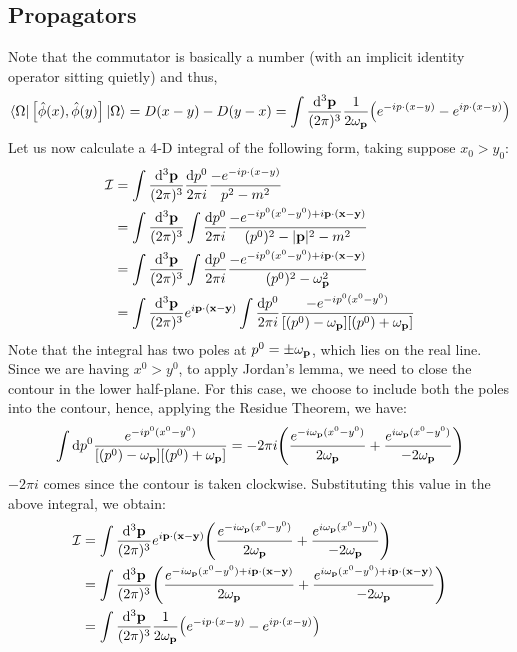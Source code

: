\subsection{Propagators}
Note that the commutator is basically a number (with an implicit identity operator sitting quietly) and thus, 
\begin{align*}
    \bra{\Omega} \left[ \hat{\phi}(x),  \hat{\phi}(y) \right]\ket{\Omega} = D(x-y) - D(y-x) = \int\frac{\dd^3\vb{{\vb{p}}}}{(2\pi)^3}\frac{1}{2\omega_{\vb{{p}}}} \qty(e^{-i p \cdot (x-y)} - e^{ip\cdot (x-y)})
\end{align*}
Let us now calculate a 4-D integral of the following form, taking suppose $x_0>y_0$:
\begin{align*}
    \mathcal{I} &= \int\frac{\dd^3\vb{{\vb{p}}}}{(2\pi)^3} \frac{\dd p^0}{2\pi i} \frac{-e^{-i p\cdot (x-y)}}{p^2-m^2}\\
    &= \int\frac{\dd^3\vb{{\vb{p}}}}{(2\pi)^3} \int\frac{\dd p^0}{2\pi i} \frac{-e^{-i p^0(x^0-y^0) + i \vb{p}\cdot( \vb{x}- \vb{y})}}{(p^0)^2-|\vb{p}|^2-m^2}\\
     &= \int\frac{\dd^3\vb{{\vb{p}}}}{(2\pi)^3} \int\frac{\dd p^0}{2\pi i} \frac{-e^{-i p^0(x^0-y^0) + i \vb{p}\cdot( \vb{x}- \vb{y})}}{(p^0)^2-\omega_{\vb{{p}}}^2}\\
     &= \int\frac{\dd^3\vb{{\vb{p}}}}{(2\pi)^3}e^{i \vb{p}\cdot( \vb{x}- \vb{y})}\int \frac{\dd p^0}{2\pi i}  \frac{-e^{-i p^0(x^0-y^0) }}{[(p^0)-\omega_{\vb{{p}}}][(p^0)+\omega_{\vb{{p}}}]}
\end{align*}
Note that the integral has two poles at $p^0 = \pm\omega_{\vb{{p}}}$, which lies on the real line. Since we are having $x^0>y^0$, to apply Jordan's lemma, we need to close the contour in the lower half-plane. For this case, we choose to include both the poles into the contour, hence, applying the Residue Theorem, we have:
\begin{align*}
    \int {\dd p^0} \frac{e^{-i p^0(x^0-y^0) }}{[(p^0)-\omega_{\vb{{p}}}][(p^0)+\omega_{\vb{{p}}}]} = -2\pi i \qty(\frac{e^{-i\omega_{\vb{{p}}} (x^0-y^0)}}{2\omega_{\vb{{p}}}} + \frac{e^{i\omega_{\vb{{p}}} (x^0-y^0)}}{-2\omega_{\vb{{p}}}})
\end{align*}
$-2\pi i$ comes since the contour is taken clockwise. Substituting this value in the above integral, we obtain:
\begin{align*}
     \mathcal{I} &= \int\frac{\dd^3\vb{{\vb{p}}}}{(2\pi)^3}e^{i \vb{p}\cdot( \vb{x}- \vb{y})} \qty(\frac{e^{-i\omega_{\vb{{p}}} (x^0-y^0)}}{2\omega_{\vb{{p}}}} + \frac{e^{i\omega_{\vb{{p}}} (x^0-y^0)}}{-2\omega_{\vb{{p}}}}) \\
     &=\int\frac{\dd^3\vb{{\vb{p}}}}{(2\pi)^3} \qty(\frac{e^{-i\omega_{\vb{{p}}} (x^0-y^0) +i \vb{p}\cdot( \vb{x}- \vb{y})}}{2\omega_{\vb{{p}}}} + \frac{e^{i\omega_{\vb{{p}}} (x^0-y^0) +i \vb{p}\cdot( \vb{x}- \vb{y})}}{-2\omega_{\vb{{p}}}})\\
     &=\int\frac{\dd^3\vb{{\vb{p}}}}{(2\pi)^3}\frac{1}{2\omega_{\vb{{p}}}} \qty(e^{-i p \cdot (x-y)} - e^{ip\cdot (x-y)})
\end{align*}
